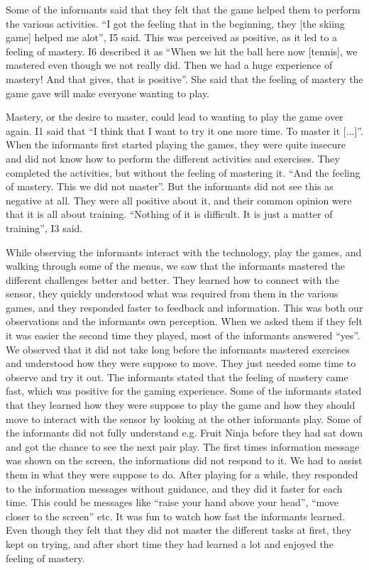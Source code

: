 Some of the informants said that they felt that the game helped them to perform the various activities. “I got the feeling that in the beginning, they [the skiing game] helped me alot”, I5 said. This was perceived as positive, as it led to a feeling of mastery. I6 described it as “When we hit the ball here now [tennis], we mastered even though we not really did. Then we had a huge experience of mastery! And that gives, that is positive”. She said that the feeling of mastery the game gave will make everyone wanting to play.  

Mastery, or the desire to master, could lead to wanting to play the game over again. I1 said that “I think that I want to try it one more time. To master it [...]”. When the informants first started playing the games, they were quite insecure and did not know how to perform the different activities and exercises. They completed the activities, but without the feeling of mastering it. “And the feeling of mastery. This we did not master”. But the informants did not see this as negative at all. They were all positive about it, and their common opinion were that it is all about training. “Nothing of it is difficult. It is just a matter of training”, I3 said. 

While observing the informants interact with the technology, play the games, and walking through some of the menus, we saw that the informants mastered the different challenges better and better. They learned how to connect with the sensor, they quickly understood what was required from them in the various games, and they responded faster to feedback and information. This was both our observations and the informants own perception. When we asked them if they felt it was easier the second time they played, most of the informants answered “yes”. We observed that it did not take long before the informants mastered exercises and understood how they were suppose to move. They just needed some time to observe and try it out. The informants stated that the feeling of mastery came fast, which was positive for the gaming experience. Some of the informants stated that they learned how they were suppose to play the game and how they should move to interact with the sensor by looking at the other informants play. Some of the informants did not fully understand e.g. Fruit Ninja before they had sat down and got the chance to see the next pair play. The first times information message was shown on the screen, the informations did not respond to it. We had to assist them in what they were suppose to do. After playing for a while, they responded to the information messages without guidance, and they did it faster for each time. This could be messages like “raise your hand above your head”, “move closer to the screen” etc. It was fun to watch how fast the informants learned. Even though they felt that they did not master the different tasks at first, they kept on trying, and after short time they had learned a lot and enjoyed the feeling of mastery. 

